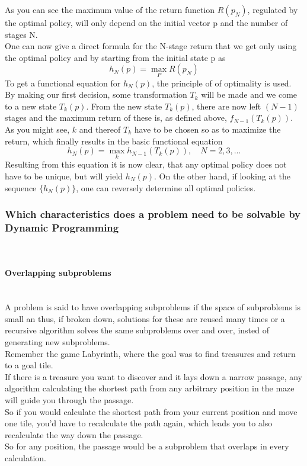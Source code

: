 \documentclass[conference]{IEEEtran}
\begin{document}
As you can see the maximum value of the return function $R(p_N)$, regulated by the optimal policy, will only depend on the initial vector p and the number of stages N.
\\
One can now give a direct formula for the N-stage return that we get only using the optimal policy and by starting from the initial state p as
\begin{equation}
h_N(p) = \max_P R(p_N)
\end{equation}
To get a functional equation for $h_N(p)$, the principle of of optimality is used. By making our first decision, some transformation $T_k$ will be made and we come to a new state $T_k(p)$.
From the new state $T_k(p)$, there are now left $(N-1)$ stages and the maximum return of these is, as defined above, $f_{N-1}(T_k(p))$. 
\\
As you might see, $k$ and thereof $T_k$ have to be chosen so as to maximize the return, which finally results in the basic functional equation
\begin{equation}
h_N(p) = \max_k h_{N-1}(T_k(p)), \quad N = 2, 3, ...
\end{equation}
Resulting from this equation it is now clear, that any optimal policy does not have to be unique, but will yield $h_N(p)$. On the other hand, if looking at the sequence $\{h_N(p)\}$, one can reversely determine all optimal policies.
\cite{Bellman.30.07.1954}\\
\subsubsection{Which characteristics does a problem need to be solvable by Dynamic Programming}
\quad \\
\paragraph{Overlapping subproblems}
\quad \\
A problem is said to have overlapping subproblems if the space of subproblems is small an thus, if broken down, solutions for these are reused many times or a recursive algorithm solves the same subproblems over and over, insted of generating new subproblems. \cite{Cormen.2009}
\\
Remember the game Labyrinth, where the goal was to find treasures and return to a goal tile.\\
If there is a treasure you want to discover and it lays down a narrow passage, any algorithm calculating the shortest path from any arbitrary position in the maze will guide you through the passage.\\
So if you would calculate the shortest path from your current position and move one tile, you'd have to recalculate the path again, which leads you to also recalculate the way down the passage.\\
So for any position, the passage would be a subproblem that overlaps in every calculation. 
\end{document}
